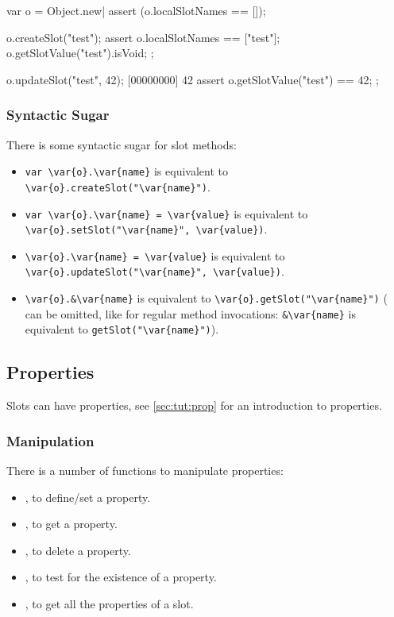 \begin{urbiscript}
var o = Object.new|
assert (o.localSlotNames == []);

o.createSlot("test");
assert
{
  o.localSlotNames == ["test"];
  o.getSlotValue("test").isVoid;
};

o.updateSlot("test", 42);
[00000000] 42
assert
{
  o.getSlotValue("test") == 42;
};
\end{urbiscript}

\subsubsection{Syntactic Sugar}

There is some syntactic sugar for slot methods:
\begin{itemize}
\item \lstinline|var \var{o}.\var{name}| is equivalent to
  \lstinline[style=varInString]|\var{o}.createSlot("\var{name}")|.
\item \lstinline|var \var{o}.\var{name} = \var{value}| is equivalent to
  \lstinline[style=varInString]|\var{o}.setSlot("\var{name}", \var{value})|.
\item \lstinline|\var{o}.\var{name} = \var{value}| is equivalent to
  \lstinline[style=varInString]|\var{o}.updateSlot("\var{name}", \var{value})|.
\item \lstinline|\var{o}.&\var{name}| is equivalent to
  \lstinline[style=varInString]|\var{o}.getSlot("\var{name}")| ( can
  be omitted, like for regular method invocations: \lstinline|&\var{name}|
  is equivalent to \lstinline[style=varInString]|getSlot("\var{name}")|).
\end{itemize}


\subsection{Properties}
\label{sec:lang:prop}


Slots can have properties, see \autoref{sec:tut:prop} for an introduction to
properties.

\subsubsection{Manipulation}

There is a number of functions to manipulate properties:
\begin{itemize}
\item {}, to define/set a property.
\item {}, to get a property.
\item {}, to delete a property.
\item {}, to test for the existence of a
  property.
\item {}, to get all the properties of a slot.
\end{itemize}

